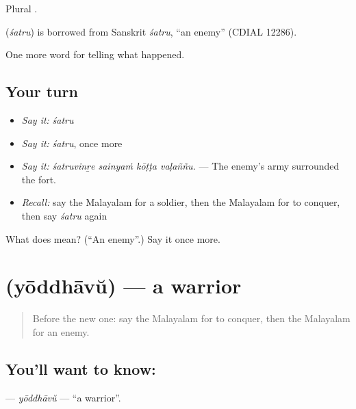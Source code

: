 Plural .

\begin{cousinweb}
\textbf{} (\emph{śatru}) is borrowed from Sanskrit \emph{śatru}, \textquotedblleft{}an enemy\textquotedblright{} (CDIAL 12286).
\end{cousinweb}

\begin{grammarlens}[title={What you've built}]
One more word for telling what happened.
\end{grammarlens}

\subsection*{Your turn}
\begin{itemize}
\raggedright
  \item \emph{Say it:} \emph{śatru}
  \item \emph{Say it:} \emph{śatru}, once more
  \item \emph{Say it:} \emph{śatruvinṟe sainyaṁ kōṭṭa vaḷaññu.} — The enemy's army surrounded the fort.
  \item \emph{Recall:} say the Malayalam for a soldier, then the Malayalam for to conquer, then say \emph{śatru} again
\end{itemize}

\begin{tcolorbox}[breakable,colback=teal!4,colframe=teal!35!black,title={Before you move on}]
What does  mean? (\textquotedblleft{}An enemy\textquotedblright{}.) Say it once more.
\end{tcolorbox}
\section[\texorpdfstring{\ml{യോദ്ധാവ്} (yōddhāvŭ)}{യോദ്ധാവ് (yōddhāvŭ)}]{ (yōddhāvŭ) — a warrior}

\label{lesson:ML-C400-yoddhavu}



\begin{quote}
Before the new one: say the Malayalam for to conquer, then the Malayalam for an enemy.
\end{quote}

\subsection*{You'll want to know: }
\textbf{} — \emph{yōddhāvŭ} — \textquotedblleft{}a warrior\textquotedblright{}.

